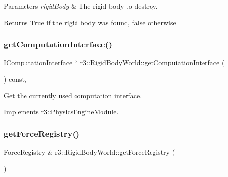 \begin{DoxyParams}{Parameters}
{\em rigid\+Body} & The rigid body to destroy. \\
\hline
\end{DoxyParams}
\begin{DoxyReturn}{Returns}
True if the rigid body was found, false otherwise. 
\end{DoxyReturn}
\mbox{\label{classr3_1_1_rigid_body_world_ac25b39a5b15666d99f42b68f29f8a97b}} 
\subsubsection{\texorpdfstring{get\+Computation\+Interface()}{getComputationInterface()}}
{\footnotesize\ttfamily \mbox{\hyperlink{classr3_1_1_i_computation_interface}{I\+Computation\+Interface}} $\ast$ r3\+::\+Rigid\+Body\+World\+::get\+Computation\+Interface (\begin{DoxyParamCaption}{ }\end{DoxyParamCaption}) const\hspace{0.3cm}{\ttfamily [override]}, {\ttfamily [virtual]}}

Get the currently used computation interface. 

Implements \mbox{\hyperlink{classr3_1_1_physics_engine_module_a3b1d0d9bea0a82534f367f6d728312d3}{r3\+::\+Physics\+Engine\+Module}}.

\mbox{\label{classr3_1_1_rigid_body_world_acfdc56e2796e5e0d86dbf71582e1b8c2}} 
\subsubsection{\texorpdfstring{get\+Force\+Registry()}{getForceRegistry()}\hspace{0.1cm}{\footnotesize\ttfamily [1/2]}}
{\footnotesize\ttfamily \mbox{\hyperlink{classr3_1_1_force_registry}{Force\+Registry}} \& r3\+::\+Rigid\+Body\+World\+::get\+Force\+Registry (\begin{DoxyParamCaption}{ }\end{DoxyParamCaption})}


